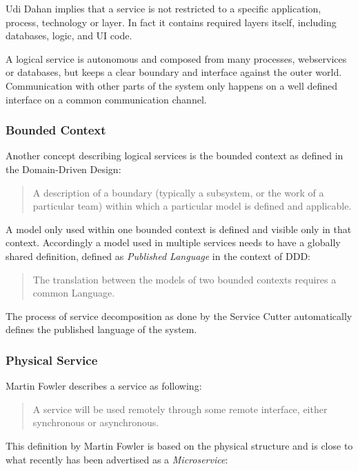 Udi Dahan implies that a service is not restricted to a specific application, process, technology or layer. In fact it contains required layers itself, including databases, logic, and \gls{UI} code.

A logical service is autonomous and composed from many processes, webservices or databases, but keeps a clear boundary and interface against the outer world. Communication with other parts of the system only happens on a well defined interface on a common communication channel.

\subsubsection{Bounded Context}

Another concept describing logical services is the bounded context as defined in the Domain-Driven Design:\cite{evans2014domain}

\begin{quotation}
	A description of a boundary (typically a subsystem, or the work of a particular team) within which a particular model is defined and applicable.
\end{quotation}

A model only used within one bounded context is defined and visible only in that context. Accordingly a model used in multiple services needs to have a globally shared definition, defined as \textit{Published Language} in the context of \gls{DDD}\cite{evans2014domain}:

\begin{quotation}
	The translation between the models of two bounded contexts requires a common Language.
\end{quotation}

The process of service decomposition as done by the Service Cutter automatically defines the published language of the system. 

\subsubsection{Physical Service}

Martin Fowler describes a service as following:

\begin{quotation}
	A service will be used remotely through some remote interface, either synchronous or asynchronous.\cite{fowlerIoC}
\end{quotation}

This definition by Martin Fowler is based on the physical structure and is close to what recently has been advertised as a \textit{Microservice}:

